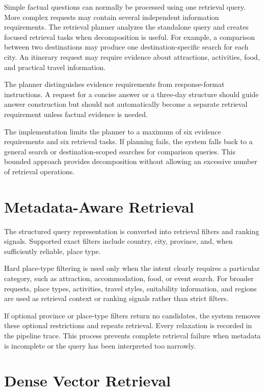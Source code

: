 Simple factual questions can normally be processed using one retrieval query.
More complex requests may contain several independent information requirements.
The retrieval planner analyzes the standalone query and creates focused
retrieval tasks when decomposition is useful. For example, a comparison between
two destinations may produce one destination-specific search for each city. An
itinerary request may require evidence about attractions, activities, food, and
practical travel information.

The planner distinguishes evidence requirements from response-format
instructions. A request for a concise answer or a three-day structure should
guide answer construction but should not automatically become a separate
retrieval requirement unless factual evidence is needed.

The implementation limits the planner to a maximum of six evidence requirements
and six retrieval tasks. If planning fails, the system falls back to a general
search or destination-scoped searches for comparison queries. This bounded
approach provides decomposition without allowing an excessive number of
retrieval operations.

\section{Metadata-Aware Retrieval}

The structured query representation is converted into retrieval filters and
ranking signals. Supported exact filters include country, city, province, and,
when sufficiently reliable, place type.

Hard place-type filtering is used only when the intent clearly requires a
particular category, such as attraction, accommodation, food, or event search.
For broader requests, place types, activities, travel styles, suitability
information, and regions are used as retrieval context or ranking signals
rather than strict filters.

If optional province or place-type filters return no candidates, the system
removes these optional restrictions and repeats retrieval. Every relaxation is
recorded in the pipeline trace. This process prevents complete retrieval
failure when metadata is incomplete or the query has been interpreted too
narrowly.

\section{Dense Vector Retrieval}

